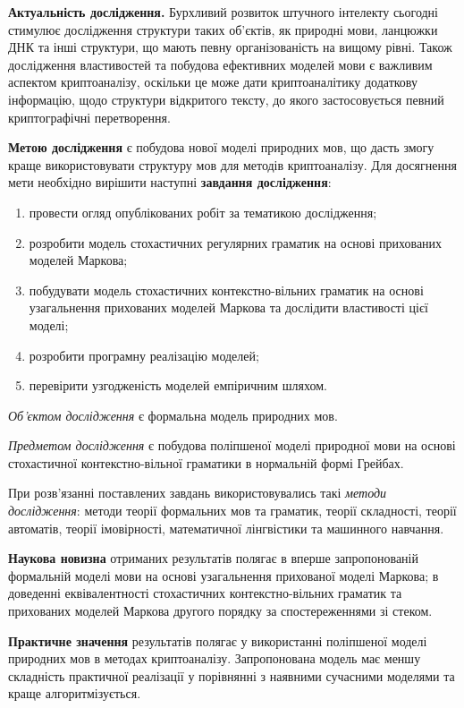 \textbf{Актуальність дослідження.} Бурхливий розвиток штучного інтелекту сьогодні
стимулює дослідження структури таких об'єктів, як природні мови, ланцюжки ДНК та інші структури, що
мають певну організованість на вищому рівні. Також дослідження властивостей та побудова ефективних
моделей мови є важливим аспектом криптоаналізу, оскільки це може дати криптоаналітику додаткову
інформацію, щодо структури відкритого тексту, до якого застосовується певний криптографічні перетворення.

\textbf{Метою дослідження} є побудова нової моделі природних мов, що дасть змогу краще
використовувати структуру мов для методів криптоаналізу. Для досягнення мети необхідно
вирішити наступні \textbf{завдання дослідження}:


\begin{enumerate}
\item провести огляд опублікованих робіт за тематикою дослідження;
\item розробити модель стохастичних регулярних граматик на основі прихованих моделей Маркова;
\item побудувати модель стохастичних контекстно-вільних граматик на основі узагальнення прихованих моделей Маркова та дослідити властивості цієї моделі;
\item розробити програмну реалізацію моделей;
\item перевірити узгодженість моделей емпіричним шляхом.
\end{enumerate}

\emph{Об'єктом дослідження} є формальна модель природних мов.

\emph{Предметом дослідження} є побудова поліпшеної моделі природної мови на основі стохастичної контекстно-вільної граматики в нормальній формі Грейбах.

При розв’язанні поставлених завдань використовувались такі \emph{методи дослідження}: методи теорії формальних мов та граматик,
теорії складності, теорії автоматів, теорії імовірності, математичної лінгвістики та машинного навчання.

\textbf{Наукова новизна} отриманих результатів полягає в вперше запропонованій формальній моделі мови на основі узагальнення прихованої моделі Маркова; в доведенні еквівалентності стохастичних контекстно-вільних граматик та прихованих моделей Маркова другого порядку за спостереженнями зі стеком.

\textbf{Практичне значення} результатів полягає у використанні поліпшеної моделі природних мов в методах криптоаналізу. Запропонована модель має меншу складність практичної реалізації у порівнянні з наявними сучасними моделями та краще алгоритмізується.


